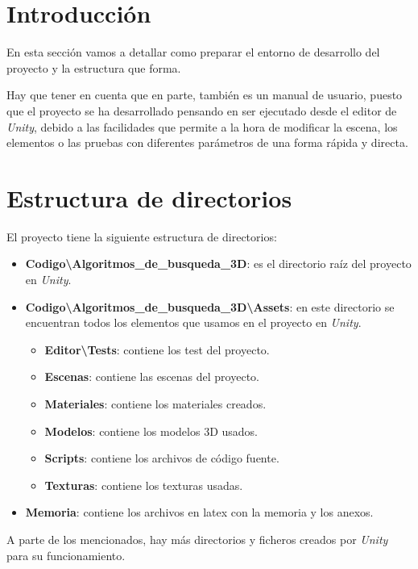 
\section{Introducción}
En esta sección vamos a detallar como preparar el entorno de desarrollo del proyecto y la estructura que forma.

Hay que tener en cuenta que en parte, también es un manual de usuario, puesto que el proyecto se ha desarrollado pensando en ser ejecutado desde el editor de \textit{Unity}, debido a las facilidades que permite a la hora de modificar la escena, los elementos o las pruebas con diferentes parámetros de una forma rápida y directa.

\section{Estructura de directorios}
El proyecto tiene la siguiente estructura de directorios:

\begin{itemize}
\item \textbf{Codigo\textbackslash Algoritmos\_de\_busqueda\_3D}: es el directorio raíz del proyecto en \textit{Unity}.
\item \textbf{Codigo\textbackslash Algoritmos\_de\_busqueda\_3D\textbackslash Assets}: en este directorio se encuentran todos los elementos que usamos en el proyecto en \textit{Unity}.
	\begin{itemize}
	\item \textbf{Editor\textbackslash Tests}: contiene los test del proyecto.
	\item \textbf{Escenas}: contiene las escenas del proyecto.
	\item \textbf{Materiales}: contiene los materiales creados.
	\item \textbf{Modelos}: contiene los modelos 3D usados.
	\item \textbf{Scripts}: contiene los archivos de código fuente.
	\item \textbf{Texturas}: contiene los texturas usadas.
	\end{itemize}
\item \textbf{Memoria}: contiene los archivos en latex con la memoria y los anexos.
\end{itemize}

A parte de los mencionados, hay más directorios y ficheros creados por \textit{Unity} para su funcionamiento.

